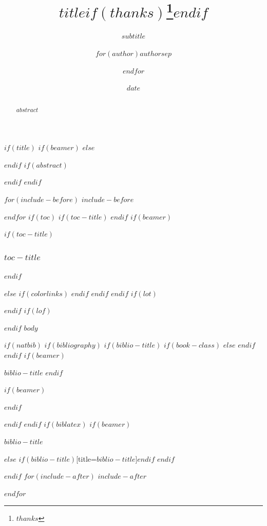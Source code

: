 \documentclass[
$if(fontsize)$
  $fontsize$,
$endif$
$if(lang)$
  $babel-lang$,
$endif$
$if(papersize)$
  $papersize$paper,
$endif$
$if(beamer)$
  ignorenonframetext,
$if(handout)$
  handout,
$endif$
$if(aspectratio)$
  aspectratio=$aspectratio$,
$endif$
$endif$
$for(classoption)$
  $classoption$$sep$,
$endfor$
]{$documentclass$}
\title{$title$$if(thanks)$\thanks{$thanks$}$endif$}
\subtitle{$subtitle$}
\author{$for(author)$$author$$sep$ \and $endfor$}
\date{$date$}
\institute{$for(institute)$$institute$$sep$ \and $endfor$}
\newif\ifbibliography
\begin{document}
$if(title)$
$if(beamer)$
\frame{\titlepage}
$else$
\maketitle
$endif$
$if(abstract)$
\begin{abstract}
$abstract$
\end{abstract}
$endif$
$endif$

$for(include-before)$
$include-before$

$endfor$
$if(toc)$
$if(toc-title)$
\renewcommand*\contentsname{$toc-title$}
$endif$
$if(beamer)$
\begin{frame}
$if(toc-title)$
  \frametitle{$toc-title$}
$endif$
  \tableofcontents[hideallsubsections]
\end{frame}
$else$
{
$if(colorlinks)$
\hypersetup{linkcolor=$if(toccolor)$$toccolor$$else$$endif$}
$endif$
\setcounter{tocdepth}{$toc-depth$}
\tableofcontents
}
$endif$
$endif$
$if(lot)$
\listoftables
$endif$
$if(lof)$
\listoffigures
$endif$
$body$

$if(natbib)$
$if(bibliography)$
$if(biblio-title)$
$if(book-class)$
\renewcommand\bibname{$biblio-title$}
$else$
\renewcommand\refname{$biblio-title$}
$endif$
$endif$
$if(beamer)$
\begin{frame}[allowframebreaks]{$biblio-title$}
  \bibliographytrue
$endif$
  
$if(beamer)$
\end{frame}
$endif$

$endif$
$endif$
$if(biblatex)$
$if(beamer)$
\begin{frame}[allowframebreaks]{$biblio-title$}
  \bibliographytrue
  \printbibliography[heading=none]
\end{frame}
$else$
\printbibliography$if(biblio-title)$[title=$biblio-title$]$endif$
$endif$

$endif$
$for(include-after)$
$include-after$

$endfor$
\end{document}

